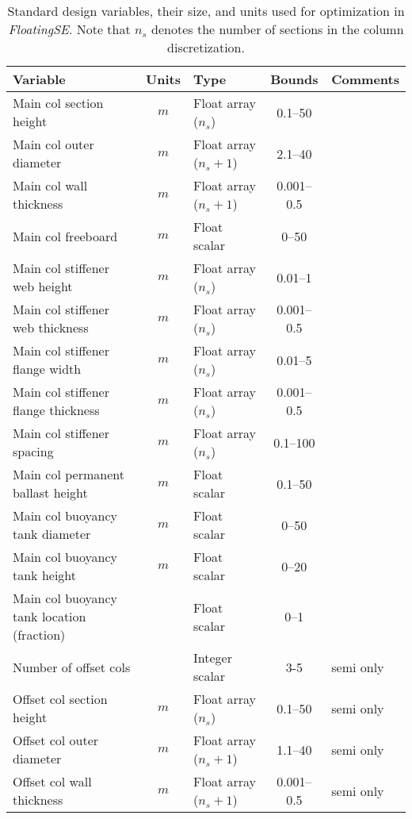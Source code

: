 \begin{table}[htbp] \begin{center}
    \caption{Standard design variables, their size, and units used for
      optimization in \textit{FloatingSE}.  Note that $n_s$ denotes the
      number of sections in the column discretization.}
    \label{tbl:designvar}
{\footnotesize
  \begin{tabular}{ l c l c l } \hline
    \textbf{Variable} & \textbf{Units} & \textbf{Type} & \textbf{Bounds} & \textbf{Comments} \\ \hline \hline
    Main col section height & \unit{$m$} & Float array ($n_s$) & 0.1--50 &\\
    Main col outer diameter & \unit{$m$} & Float array ($n_s+1$) &2.1--40 &\\
    Main col wall thickness & \unit{$m$} & Float array ($n_s+1$)  &0.001--0.5 &\\
    Main col freeboard & \unit{$m$} & Float scalar &0--50 &\\
    Main col stiffener web height & \unit{$m$} & Float array ($n_s$) &0.01--1 &\\
    Main col stiffener web thickness & \unit{$m$} & Float array ($n_s$) &0.001--0.5 &\\
    Main col stiffener flange width & \unit{$m$} & Float array ($n_s$) &0.01--5 &\\
    Main col stiffener flange thickness & \unit{$m$} & Float array ($n_s$) &0.001--0.5 &\\
    Main col stiffener spacing & \unit{$m$} & Float array ($n_s$) &0.1--100 &\\
    Main col permanent ballast height & \unit{$m$} & Float scalar &0.1--50 &\\
    Main col buoyancy tank diameter & \unit{$m$} & Float scalar &0--50 &\\
    Main col buoyancy tank height & \unit{$m$} & Float scalar &0--20 &\\
    Main col buoyancy tank location (fraction) && Float scalar &0--1 &\\
    \hline
    Number of offset cols && Integer scalar & 3-5 & semi only\\
    Offset col section height & \unit{$m$} & Float array ($n_s$) &0.1--50&semi only\\
    Offset col outer diameter & \unit{$m$} & Float array ($n_s+1$)&1.1--40&semi only\\
    Offset col wall thickness & \unit{$m$} & Float array ($n_s+1$) &0.001--0.5&semi only\\

\end{tabular}}
\end{center}
\end{table}
